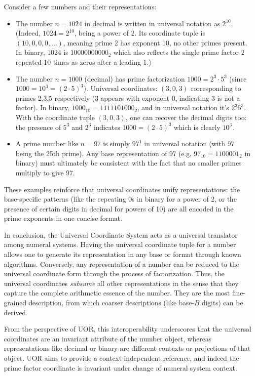\documentclass[11pt]{article}
\begin{document}
\begin{example}
Consider a few numbers and their representations:
\begin{itemize}
    \item The number $n = 1024$ in decimal is written in universal notation as $2^{10}$. (Indeed, $1024 = 2^{10}$, being a power of 2. Its coordinate tuple is $(10,0,0,0,\dots)$, meaning prime 2 has exponent 10, no other primes present. In binary, $1024$ is $10000000000_2$ which also reflects the single prime factor 2 repeated 10 times as zeros after a leading 1.)
    \item The number $n = 1000$ (decimal) has prime factorization $1000 = 2^3 \cdot 5^3$ (since $1000 = 10^3 = (2\cdot5)^3$). Universal coordinates: $(3,0,3)$ corresponding to primes 2,3,5 respectively (3 appears with exponent 0, indicating 3 is not a factor). In binary, $1000_{10} = 1111101000_2$, and in universal notation it's $2^3 5^3$. With the coordinate tuple $(3,0,3)$, one can recover the decimal digits too: the presence of $5^3$ and $2^3$ indicates $1000 = (2\cdot5)^3$ which is clearly $10^3$. 
    \item A prime number like $n=97$ is simply $97^1$ in universal notation (with 97 being the 25th prime). Any base representation of 97 (e.g. $97_{10} = 1100001_2$ in binary) must ultimately be consistent with the fact that no smaller primes multiply to give 97.
\end{itemize}
These examples reinforce that universal coordinates unify representations: the base-specific patterns (like the repeating 0s in binary for a power of 2, or the presence of certain digits in decimal for powers of 10) are all encoded in the prime exponents in one concise format.
\end{example}

In conclusion, the Universal Coordinate System acts as a universal translator among numeral systems. Having the universal coordinate tuple for a number allows one to generate its representation in any base or format through known algorithms. Conversely, any representation of a number can be reduced to the universal coordinate form through the process of factorization. Thus, the universal coordinates \emph{subsume} all other representations in the sense that they capture the complete arithmetic essence of the number. They are the most fine-grained description, from which coarser descriptions (like base-$B$ digits) can be derived.

From the perspective of UOR, this interoperability underscores that the universal coordinates are an invariant attribute of the number object, whereas representations like decimal or binary are different contexts or projections of that object. UOR aims to provide a context-independent reference, and indeed the prime factor coordinate is invariant under change of numeral system context.
\end{document}
